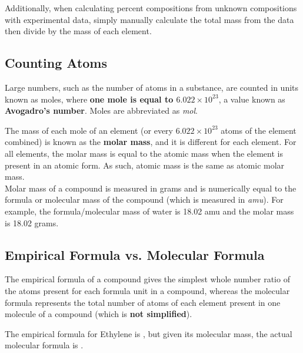 Additionally, when calculating percent compositions from unknown compositions with experimental data, simply manually calculate the total mass from the data then divide by the mass of each element.

\subsection{Counting Atoms}

\begin{defn}
Large numbers, such as the number of atoms in a substance, are counted in units known as moles, where \textbf{one mole is equal to $6.022 \times 10^{23}$}, a value known as \textbf{Avogadro's number}. Moles are abbreviated as \textit{mol}.
\end{defn}

\noindent
The mass of each mole of an element (or every $6.022 \times 10^{23}$ atoms of the element combined) is known as the \textbf{molar mass}, and it is different for each element. For all elements, the molar mass is equal to the atomic mass when the element is present in an atomic form. As such, atomic mass is the same as atomic molar mass. \\

\noindent
Molar mass of a compound is measured in grams and is numerically equal to the formula or molecular mass of the compound (which is measured in \textit{amu}). For example, the formula/molecular mass of water is 18.02 amu and the molar mass is 18.02 grams.

\subsection{Empirical Formula vs. Molecular Formula}
\begin{defn}
The empirical formula of a compound gives the simplest whole number ratio of the atoms present for each formula unit in a compound, whereas the molecular formula represents the total number of atoms of each element present in one molecule of a compound (which is \textbf{not simplified}).
\end{defn}

\noindent
{}

\begin{example}
The empirical formula for Ethylene is , but given its molecular mass, the actual molecular formula is .
\end{example}

